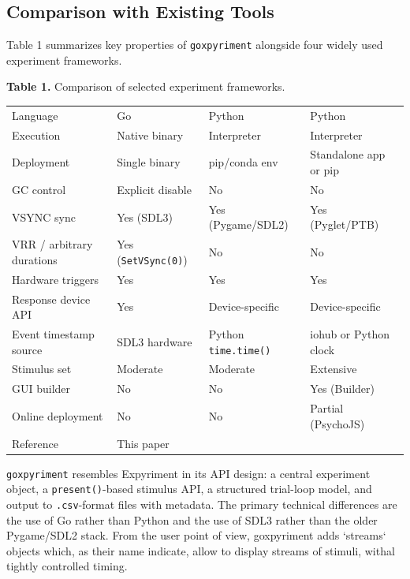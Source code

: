 \documentclass[jou,a4paper]{apa7}
\begin{document}
\subsection{Comparison with Existing Tools}\label{comparison-with-existing-tools}

Table 1 summarizes key properties of \texttt{goxpyriment} alongside
four widely used experiment frameworks.


\textbf{Table 1.} Comparison of selected experiment frameworks.
{\small
{}
\tablelasttail{\bottomrule\noalign{}}

\begin{xtabular}{@{}
  >{\raggedright\arraybackslash}p{(\columnwidth - 6\tabcolsep) * }
  >{\raggedright\arraybackslash}p{(\columnwidth - 6\tabcolsep) * }
  >{\raggedright\arraybackslash}p{(\columnwidth - 6\tabcolsep) * }
  >{\raggedright\arraybackslash}p{(\columnwidth - 6\tabcolsep) * }@{}}
Language & Go & Python & Python \\
Execution & Native binary & Interpreter & Interpreter \\
Deployment & Single binary & pip/conda env & Standalone app or pip \\
GC control & Explicit disable & No & No \\
VSYNC sync & Yes (SDL3) & Yes (Pygame/SDL2) & Yes (Pyglet/PTB) \\
VRR / arbitrary durations & Yes (\texttt{SetVSync(0)}) & No & No \\
Hardware triggers & Yes & Yes & Yes \\
Response device API & Yes & Device-specific & Device-specific \\
Event timestamp source & SDL3 hardware & Python \texttt{time.time()} & iohub or Python clock \\
Stimulus set & Moderate & Moderate & Extensive \\
GUI builder & No & No & Yes (Builder) \\
Online deployment & No & No & Partial (PsychoJS) \\
Reference & This paper & \parencite{krause2014} & \parencite{peirce2019} \\
\end{xtabular}
}

\texttt{goxpyriment} resembles Expyriment in its API
design: a central experiment object, a \texttt{present()}-based stimulus
API, a structured trial-loop model, and output to \texttt{.csv}-format
files with metadata. The primary technical differences are the use of Go rather than Python
and the use of SDL3 rather than the older Pygame/SDL2 stack. From the user point of view, goxpyriment adds `streams` objects which, as their name indicate, allow to display streams of stimuli, withal tightly controlled timing.  
\end{document}

